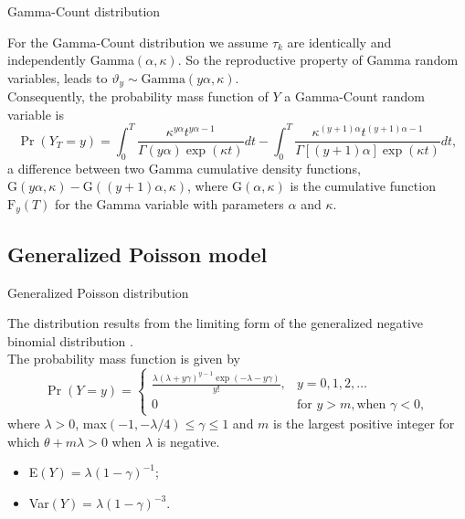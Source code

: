 \documentclass[11pt]{beamer}\usepackage[]{graphicx}\usepackage[]{color}
\begin{document}
\begin{frame}{Gamma-Count distribution}

  For the Gamma-Count distribution we assume $\tau_k$ are identically
  and independently Gamma$(\alpha, \kappa)$. So the reproductive property
  of Gamma random variables, leads to $\vartheta_y \sim
  \text{Gamma}(y\alpha, \kappa)$. \\[0.5cm]

  Consequently, the probability mass function of $Y$ a Gamma-Count
  random variable is
  \begin{equation*}
    \label{eqn:pmf-gammacount}
    \Pr(Y_T = y) =
    \int_0^T \frac{\kappa^{y\alpha} t^{y\alpha - 1}}{\Gamma(y\alpha)
      \exp(\kappa t)} dt -
    \int_0^T \frac{\kappa^{(y+1)\alpha} t^{(y+1)\alpha - 1}}{
      \Gamma[(y+1)\alpha] \exp(\kappa t)} dt,
  \end{equation*}
  a difference between two Gamma cumulative density functions,
  $\text{G}(y\alpha, \kappa) - \text{G}((y+1)\alpha, \kappa)$, where
  $\text{G}(\alpha, \kappa)$ is the cumulative function $\text{F}_y(T)$
  for the Gamma variable with parameters $\alpha$ and $\kappa$.
\end{frame}

\subsection{Generalized Poisson model}

\begin{frame}{Generalized Poisson distribution}

  The distribution results from the limiting form of the generalized
  negative binomial distribution \citep{Zamani2012}.\\[0.3cm]

  The probability mass function is given by
  $$
  \Pr(Y=y) =
  \begin{cases}
    \frac{\lambda (\lambda + y\gamma)^{y-1}
      \exp(-\lambda - y\gamma)}{y!}, & y =0, 1,2,\ldots \\
    0 & \text{for } y > m, \text{when } \gamma < 0,
  \end{cases}
  $$
  where $\lambda>0$, max$(-1, -\lambda/4) \leq \gamma \leq 1$ and $m$ is
  the largest positive integer for which $\theta + m\lambda>0$ when
  $\lambda$ is negative.
  \vspace{0.3cm}
  \begin{itemize}
    \item E$(Y) = \lambda(1-\gamma)^{-1}$;
    \item Var$(Y) = \lambda(1-\gamma)^{-3}$.
  \end{itemize}
\end{frame}
\end{document}
